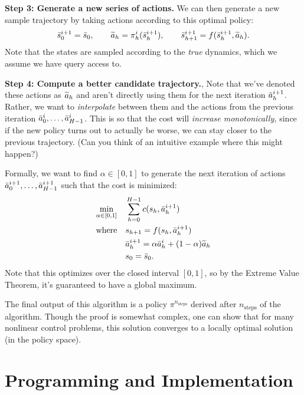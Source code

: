 \documentclass[\main/main]{subfiles}
\begin{document}
\textbf{Step 3: Generate a new series of actions.}
We can then generate a new sample trajectory by taking actions according to this optimal policy: \[
    \bar {s}^{i+1}_0 = \bar {s}_0, \qquad \widetilde {a}_h = \pi^i_h(\bar {s}^{i+1}_h), \qquad \bar {s}^{i+1}_{h+1} = f(\bar {s}^{i+1}_h, \widetilde {a}_h).
\]
Note that the states are sampled according to the \emph{true} dynamics, which we assume we have query access to.

\textbf{Step 4: Compute a better candidate trajectory.},
Note that we've denoted these actions as $\widetilde {a}_h$ and aren't directly using them for the next iteration $\bar {a}^{i+1}_h$.
Rather, we want to \emph{interpolate} between them and the actions from the previous iteration $\bar {a}^i_0, \dots, \bar {a}^i_{H-1}$.
This is so that the cost will \emph{increase monotonically,} since if the new policy turns out to actually be worse, we can stay closer to the previous trajectory. (Can you think of an intuitive example where this might happen?)

Formally, we want to find $\alpha \in [0, 1]$ to generate the next iteration of actions $\bar {a}^{i+1}_0, \dots, \bar {a}^{i+1}_{H-1}$ such that the cost is minimized:
\begin{align*}
    \min_{\alpha \in [0, 1]} \quad & \sum_{h=0}^{H-1} c(s_h, \bar {a}^{i+1}_h)                     \\
    \text{where} \quad             & s_{h+1} = f(s_h, \bar {a}^{i+1}_h)                             \\
                                   & \bar {a}^{i+1}_h = \alpha \bar {a}^i_h + (1-\alpha) \widetilde {a}_h \\
                                   & s_0 = \bar {s}_0.
\end{align*}
Note that this optimizes over the closed interval $[0, 1]$, so by the Extreme Value Theorem, it's guaranteed to have a global maximum.

The final output of this algorithm is a policy $\pi^{n_\text{steps}}$ derived after $n_\text{steps}$ of the algorithm.
Though the proof is somewhat complex, one can show that for many nonlinear control problems, this solution converges to a locally optimal solution (in the policy space).

\iffalse
    \section{Programming and Implementation}
\end{document}
